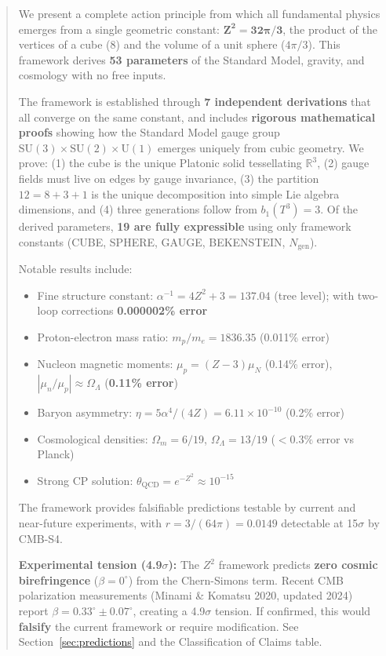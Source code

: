 \documentclass[11pt,a4paper]{article}
\theoremstyle{plain}
\theoremstyle{definition}
\theoremstyle{remark}
\newcommand{\Ngen}{N_{\text{gen}}}
\newcommand{\Omegam}{\Omega_m}
\newcommand{\OmegaL}{\Omega_\Lambda}
\newcommand{\SUthree}{\text{SU}(3)}
\newcommand{\SUtwo}{\text{SU}(2)}
\newcommand{\Uone}{\text{U}(1)}
\begin{document}
\vspace{0.5cm}


\begin{abstract}
We present a complete action principle from which all fundamental physics emerges from a single geometric constant: $\mathbf{Z^2 = 32\pi/3}$, the product of the vertices of a cube (8) and the volume of a unit sphere ($4\pi/3$). This framework derives \textbf{53 parameters} of the Standard Model, gravity, and cosmology with no free inputs.

The framework is established through \textbf{7 independent derivations} that all converge on the same constant, and includes \textbf{rigorous mathematical proofs} showing how the Standard Model gauge group $\SUthree \times \SUtwo \times \Uone$ emerges uniquely from cubic geometry. We prove: (1) the cube is the unique Platonic solid tessellating $\mathbb{R}^3$, (2) gauge fields must live on edges by gauge invariance, (3) the partition $12 = 8 + 3 + 1$ is the unique decomposition into simple Lie algebra dimensions, and (4) three generations follow from $b_1(T^3) = 3$. Of the derived parameters, \textbf{19 are fully expressible} using only framework constants (CUBE, SPHERE, GAUGE, BEKENSTEIN, $\Ngen$).

Notable results include:
\begin{itemize}[nosep]
  \item Fine structure constant: $\alpha^{-1} = 4Z^2 + 3 = 137.04$ (tree level); with two-loop corrections \textbf{0.000002\% error}
  \item Proton-electron mass ratio: $m_p/m_e = 1836.35$ (0.011\% error)
  \item Nucleon magnetic moments: $\mu_p = (Z-3)\mu_N$ (0.14\% error), $|\mu_n/\mu_p| \approx \OmegaL$ (\textbf{0.11\% error})
  \item Baryon asymmetry: $\eta = 5\alpha^4/(4Z) = 6.11 \times 10^{-10}$ (0.2\% error)
  \item Cosmological densities: $\Omegam = 6/19$, $\OmegaL = 13/19$ ($<0.3\%$ error vs Planck)
  \item Strong CP solution: $\theta_{\text{QCD}} = e^{-Z^2} \approx 10^{-15}$
\end{itemize}

The framework provides falsifiable predictions testable by current and near-future experiments, with $r = 3/(64\pi) = 0.0149$ detectable at 15$\sigma$ by CMB-S4.

\textbf{Experimental tension (4.9$\sigma$):} The $Z^2$ framework predicts \textbf{zero cosmic birefringence} ($\beta = 0^\circ$) from the Chern-Simons term. Recent CMB polarization measurements (Minami \& Komatsu 2020, updated 2024) report $\beta = 0.33^\circ \pm 0.07^\circ$, creating a 4.9$\sigma$ tension. If confirmed, this would \textbf{falsify} the current framework or require modification. See Section~\ref{sec:predictions} and the Classification of Claims table.
\end{abstract}
\end{document}
